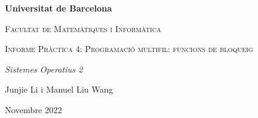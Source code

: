 \begin{titlepage}
\centering
    \vspace{1cm}
    {\bfseries\LARGE Universitat de Barcelona \par}
    \vspace{1cm}
    {\scshape\Large Facultat de Matemàtiques i Informàtica \par}
    \vspace{4cm}
    {\scshape\Huge Informe Pràctica 4: Programació multifil: funcions de bloqueig\par}
    \vspace{2cm}
    {\itshape\LARGE Sistemes Operatius 2 \par}
    \vfill
    {\Large Junjie Li i Manuel Liu Wang\par}
    \vfill
    {\Large Novembre 2022 \par}
\end{titlepage}